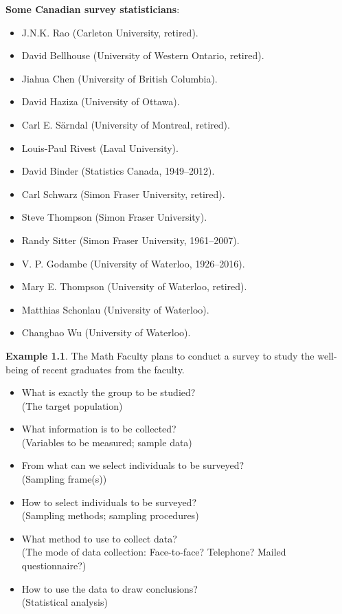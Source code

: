 \textbf{Some Canadian survey statisticians}:
\begin{itemize}
      \item J.N.K. Rao (Carleton University, retired).
      \item David Bellhouse (University of Western Ontario, retired).
      \item Jiahua Chen (University of British Columbia).
      \item David Haziza (University of Ottawa).
      \item Carl E. Särndal (University of Montreal, retired).
      \item Louis-Paul Rivest (Laval University).
      \item David Binder (Statistics Canada, 1949--2012).
      \item Carl Schwarz (Simon Fraser University, retired).
      \item Steve Thompson (Simon Fraser University).
      \item Randy Sitter (Simon Fraser University, 1961--2007).
      \item V. P. Godambe (University of Waterloo, 1926--2016).
      \item Mary E. Thompson (University of Waterloo, retired).
      \item Matthias Schonlau (University of Waterloo).
      \item Changbao Wu (University of Waterloo).
\end{itemize}

\textbf{Example 1.1}. The Math Faculty plans to conduct a survey to study
the well-being of recent graduates from the faculty.
\begin{itemize}
      \item What is exactly the group to be studied?\\
            (The target population)
      \item What information is to be collected?\\
            (Variables to be measured; sample data)
      \item From what can we select individuals to be surveyed?\\
            (Sampling frame(s))
      \item How to select individuals to be surveyed?\\
            (Sampling methods; sampling procedures)
      \item What method to use to collect data?\\
            (The mode of data collection: Face-to-face? Telephone? Mailed
            questionnaire?)
      \item How to use the data to draw conclusions?\\
            (Statistical analysis)
\end{itemize}

